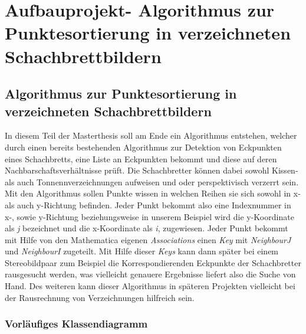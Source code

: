 \chapter{Aufbauprojekt- Algorithmus zur Punktesortierung in verzeichneten
	Schachbrettbildern}

\section{Algorithmus zur Punktesortierung in verzeichneten Schachbrettbildern}

In diesem Teil der Masterthesis soll am Ende ein Algorithmus entstehen, welcher durch einen bereits bestehenden Algorithmus zur Detektion von Eckpunkten eines Schachbretts, eine Liste an Eckpunkten bekommt und diese auf deren Nachbarschaftsverhältnisse prüft. Die Schachbretter können dabei sowohl Kissen- als auch Tonnennverzeichnungen aufweisen und oder perspektivisch verzerrt sein. Mit den Algorithmus sollen Punkte wissen in welchen Reihen sie sich sowohl in x- als auch y-Richtung befinden. Jeder Punkt bekommt also eine Indexnummer in x-, sowie y-Richtung beziehungsweise in unserem Beispiel wird die y-Koordinate als \textit{j} bezeichnet und die x-Koordinate als \textit{i}, zugewiesen. Jeder Punkt bekommt mit Hilfe von den Mathematica eigenen \textit{Associations} einen \textit{Key} mit \textit{NeighbourJ} und \textit{NeighbourI} zugeteilt. Mit Hilfe dieser \textit{Keys} kann dann später bei einem Stereobildpaar zum Beispiel die Korrespondierenden Eckpunkte der Schachbretter rausgesucht werden, was vielleicht genauere Ergebnisse liefert also die Suche von Hand. Des weiteren kann dieser Algorithmus in späteren Projekten vielleicht bei der Rausrechnung von Verzeichnungen hilfreich sein.\\

\subsection{Vorläufiges Klassendiagramm}

